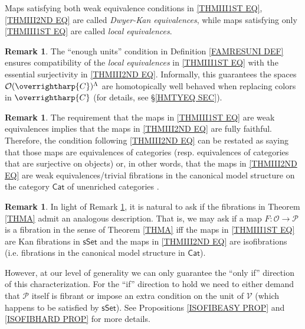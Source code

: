 \documentclass[a4paper,10pt
,draft
]{article}%
\numberwithin{equation}{section}
\numberwithin{figure}{section}
\theoremstyle{definition} %
\newtheorem{remark}[equation]{Remark}%
\newcommand{\vect}[1]{\text{\overrightharp{\ensuremath{#1}}}}
\newcommand{\V}{\ensuremath{\mathcal V}}
\renewcommand{\O}{\ensuremath{\mathcal O}}
\renewcommand{\P}{\ensuremath{\mathcal P}}
\newcommand{\1}{\ensuremath{\mathbbm 1}}%
\begin{document}
\noindent Maps satisfying both weak equivalence conditions in 
\eqref{THMIII1ST EQ},\eqref{THMIII2ND EQ}
are called \emph{Dwyer-Kan equivalences},
while maps satisfying only \eqref{THMIII1ST EQ}
are called \emph{local equivalences}.



\begin{remark}\label{WHYEU REM}
The ``enough units'' condition in Definition \ref{FAMRESUNI DEF}
ensures compatibility of the \emph{local equivalences}
in \eqref{THMIII1ST EQ}
with the essential surjectivity in	\eqref{THMIII2ND EQ}.
%
Informally, this guarantees the spaces 
$\O(\vect{C})^{\Lambda}$
are homotopically well behaved when replacing colors 
in $\vect{C}$
(for details, see \S \ref{HMTYEQ SEC}).
\end{remark}




\begin{remark}\label{WETRFCAN REM}
The requirement that the maps in 
\eqref{THMIII1ST EQ}
are weak equivalences implies that the maps in
\eqref{THMIII2ND EQ}
are fully faithful.
Therefore, the condition following \eqref{THMIII2ND EQ}
can be restated as saying that those maps are
equivalences of categories (resp. equivalences of categories that are surjective on objects) or, in other words,
that the maps in \eqref{THMIII2ND EQ}
are weak equivalences/trivial fibrations in the canonical model structure on the category $\mathsf{Cat}$ of unenriched categories
\cite{Rez}.
\end{remark}




\begin{remark}\label{FIBSALT REM}
	In light of Remark \ref{WETRFCAN REM}, 
	it is natural to ask if the fibrations in Theorem \ref{THMA}
	admit an analogous description.
	That is, we may ask if a map $F\colon \O \to \mathcal{P}$
	is a fibration in the sense of Theorem \ref{THMA}
	iff the maps in 
	\eqref{THMIII1ST EQ}
	are Kan fibrations in $\mathsf{sSet}$
	and the maps in
	\eqref{THMIII2ND EQ}
	are isofibrations (i.e. fibrations in the canonical model structure in $\mathsf{Cat}$).
	
	However, at our level of generality we can only guarantee the 
	``only if'' direction of this characterization.
	For the ``if'' direction to hold we need to either demand
	that $\P$ itself is fibrant or
	impose an extra condition on the unit of $\V$ (which happens to be satisfied by $\mathsf{sSet}$).
	See Propositions \ref{ISOFIBEASY PROP} and \ref{ISOFIBHARD PROP} for more details.
\end{remark}
\end{document}
